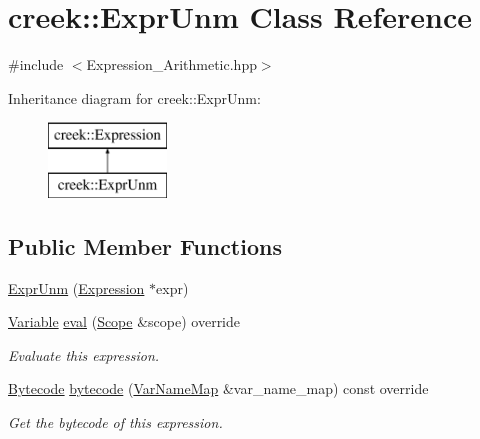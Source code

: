 \hypertarget{classcreek_1_1_expr_unm}{}\section{creek\+:\+:Expr\+Unm Class Reference}
\label{classcreek_1_1_expr_unm}


{\ttfamily \#include $<$Expression\+\_\+\+Arithmetic.\+hpp$>$}

Inheritance diagram for creek\+:\+:Expr\+Unm\+:\begin{figure}[H]
\begin{center}
\leavevmode
\includegraphics[height=2.000000cm]{classcreek_1_1_expr_unm}
\end{center}
\end{figure}
\subsection*{Public Member Functions}
\begin{DoxyCompactItemize}
\item 
\hyperlink{classcreek_1_1_expr_unm_a046567d08333ace9f6cf6d82f2c0cad9}{Expr\+Unm} (\hyperlink{classcreek_1_1_expression}{Expression} $\ast$expr)
\item 
\hyperlink{classcreek_1_1_variable}{Variable} \hyperlink{classcreek_1_1_expr_unm_a904e9e78ebed3f79b772f242fbca7fad}{eval} (\hyperlink{classcreek_1_1_scope}{Scope} \&scope) override
\begin{DoxyCompactList}\small\item\em Evaluate this expression. \end{DoxyCompactList}\item 
\hyperlink{classcreek_1_1_bytecode}{Bytecode} \hyperlink{classcreek_1_1_expr_unm_a018e147b5e34558860274a8bd8a2fe13}{bytecode} (\hyperlink{classcreek_1_1_var_name_map}{Var\+Name\+Map} \&var\+\_\+name\+\_\+map) const  override\hypertarget{classcreek_1_1_expr_unm_a018e147b5e34558860274a8bd8a2fe13}{}\label{classcreek_1_1_expr_unm_a018e147b5e34558860274a8bd8a2fe13}

\begin{DoxyCompactList}\small\item\em Get the bytecode of this expression. \end{DoxyCompactList}\end{DoxyCompactItemize}


